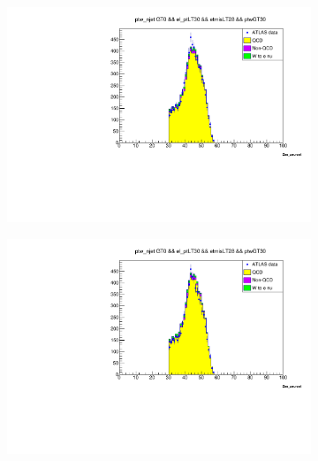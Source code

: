     \begin{figure}
        \begin{subfigure}{0.5\textwidth}
            \includegraphics[width=\textwidth]{../W_mass/final_ptw_qcd0-33.pdf}
        \end{subfigure}
        \begin{subfigure}{0.5\textwidth}
            \includegraphics[width=\textwidth]{../W_mass/final_ptw_qcd0-35.pdf}
        \end{subfigure}
        \begin{subfigure}{0.5\textwidth}

\end{subfigure}
\end{figure}
